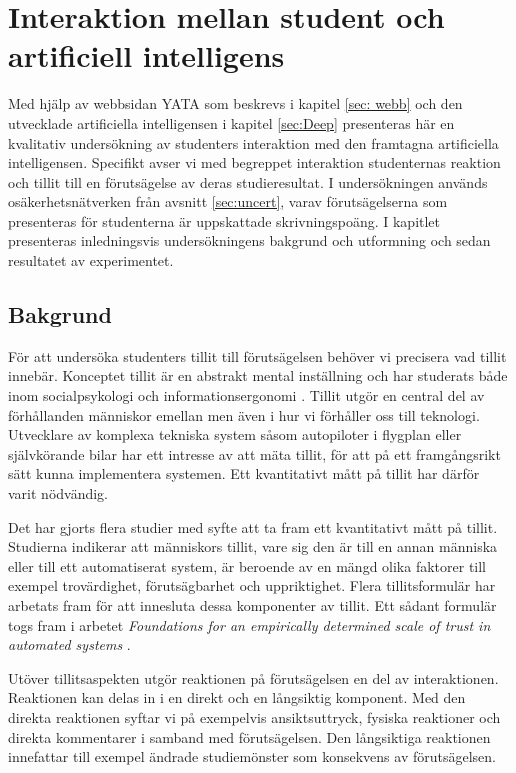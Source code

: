 \chapter{Interaktion mellan student och artificiell intelligens}
\label{sec: inter}

Med hjälp av webbsidan YATA som beskrevs i kapitel \ref{sec: webb} och den utvecklade artificiella intelligensen i kapitel \ref{sec:Deep} presenteras här en kvalitativ undersökning av studenters interaktion med den framtagna artificiella intelligensen. Specifikt avser vi med begreppet interaktion studenternas reaktion och tillit till en förutsägelse av deras studieresultat. I undersökningen används osäkerhetsnätverken från avsnitt \ref{sec:uncert}, varav förutsägelserna som presenteras för studenterna är uppskattade skrivningspoäng. I kapitlet presenteras inledningsvis undersökningens bakgrund och utformning och sedan resultatet av experimentet.

\section{Bakgrund}

För att undersöka studenters tillit till förutsägelsen behöver vi precisera vad tillit innebär. Konceptet tillit är en abstrakt mental inställning och har studerats både inom socialpsykologi och informationsergonomi \cite{ergonomi}. Tillit utgör en central del av förhållanden människor emellan men även i hur vi förhåller oss till teknologi. Utvecklare av komplexa tekniska system såsom autopiloter i flygplan eller självkörande bilar har ett intresse av att mäta tillit, för att på ett framgångsrikt sätt kunna implementera systemen. Ett kvantitativt mått på tillit har därför varit nödvändig.

Det har gjorts flera studier med syfte att ta fram ett kvantitativt mått på tillit. Studierna indikerar att människors tillit, vare sig den är till en annan människa eller till ett automatiserat system, är beroende av en mängd olika faktorer till exempel trovärdighet, förutsägbarhet och uppriktighet. Flera tillitsformulär har arbetats fram för att innesluta dessa komponenter av tillit. Ett sådant formulär togs fram i arbetet \emph{Foundations for an empirically determined scale of trust in automated systems} \cite{trust}. 

Utöver tillitsaspekten utgör reaktionen på förutsägelsen en del av interaktionen. Reaktionen kan delas in i en direkt och en långsiktig komponent. Med den direkta reaktionen syftar vi på exempelvis ansiktsuttryck, fysiska reaktioner och direkta kommentarer i samband med förutsägelsen. Den långsiktiga reaktionen innefattar till exempel ändrade studiemönster som konsekvens av förutsägelsen. 

